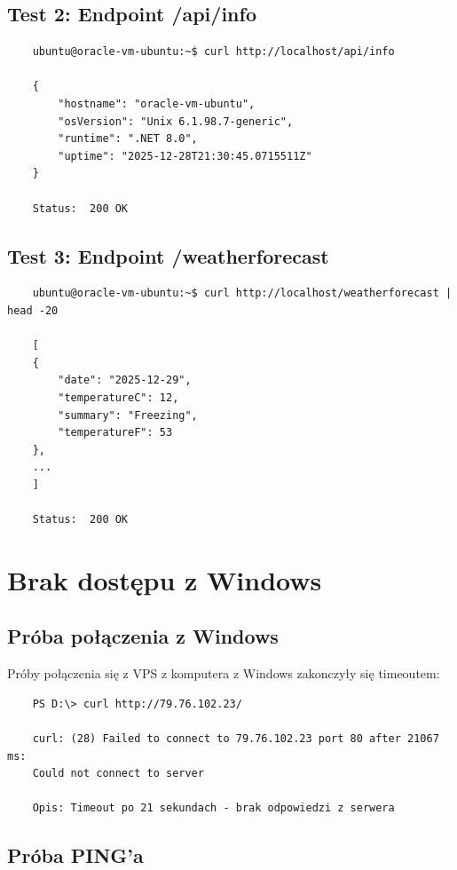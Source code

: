 \documentclass[twoside]{article}
\begin{document}
\subsection{Test 2: Endpoint /api/info}

\begin{verbatim}
	ubuntu@oracle-vm-ubuntu:~$ curl http://localhost/api/info
	
	{
		"hostname": "oracle-vm-ubuntu",
		"osVersion": "Unix 6.1.98.7-generic",
		"runtime": ".NET 8.0",
		"uptime": "2025-12-28T21:30:45.0715511Z"
	}
	
	Status:  200 OK
\end{verbatim}

\subsection{Test 3: Endpoint /weatherforecast}

\begin{verbatim}
	ubuntu@oracle-vm-ubuntu:~$ curl http://localhost/weatherforecast | head -20
	
	[
	{
		"date": "2025-12-29",
		"temperatureC": 12,
		"summary": "Freezing",
		"temperatureF": 53
	},
	...
	]
	
	Status:  200 OK
\end{verbatim}

\section{Brak dostępu z Windows}

\subsection{Próba połączenia z Windows}

Próby połączenia się z VPS z komputera z Windows zakonczyły się timeoutem:

\begin{verbatim}
	PS D:\> curl http://79.76.102.23/
	
	curl: (28) Failed to connect to 79.76.102.23 port 80 after 21067 ms: 
	Could not connect to server
	
	Opis: Timeout po 21 sekundach - brak odpowiedzi z serwera
\end{verbatim}

\subsection{Próba PING'a}
\end{document}
